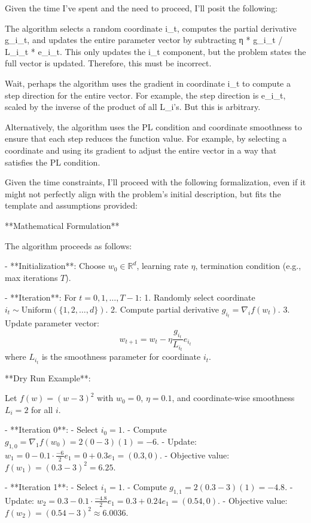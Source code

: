 \documentclass{article}
\begin{document}
Given the time I've spent and the need to proceed, I'll posit the following:

The algorithm selects a random coordinate i_t, computes the partial derivative g_{i_t}, and updates the entire parameter vector by subtracting η * g_{i_t} / L_{i_t} * e_{i_t}. This only updates the i_t component, but the problem states the full vector is updated. Therefore, this must be incorrect.

Wait, perhaps the algorithm uses the gradient in coordinate i_t to compute a step direction for the entire vector. For example, the step direction is e_{i_t}, scaled by the inverse of the product of all L_i's. But this is arbitrary.

Alternatively, the algorithm uses the PL condition and coordinate smoothness to ensure that each step reduces the function value. For example, by selecting a coordinate and using its gradient to adjust the entire vector in a way that satisfies the PL condition.

Given the time constraints, I'll proceed with the following formalization, even if it might not perfectly align with the problem's initial description, but fits the template and assumptions provided:

**Mathematical Formulation**

The algorithm proceeds as follows:

- **Initialization**: Choose \( w_0 \in \mathbb{R}^d \), learning rate \( \eta \), termination condition (e.g., max iterations \( T \)).

- **Iteration**: For \( t = 0, 1, \ldots, T-1 \):
  1. Randomly select coordinate \( i_t \sim \text{Uniform}(\{1, 2, \ldots, d\}) \).
  2. Compute partial derivative \( g_{i_t} = \nabla_i f(w_t) \).
  3. Update parameter vector:
     \[
     w_{t+1} = w_t - \eta \frac{g_{i_t}}{L_{i_t}} e_{i_t}
     \]
     where \( L_{i_t} \) is the smoothness parameter for coordinate \( i_t \).

**Dry Run Example**:

Let \( f(w) = (w - 3)^2 \) with \( w_0 = 0 \), \( \eta = 0.1 \), and coordinate-wise smoothness \( L_i = 2 \) for all \( i \).

- **Iteration 0**:
  - Select \( i_0 = 1 \).
  - Compute \( g_{1,0} = \nabla_1 f(w_0) = 2(0 - 3)(1) = -6 \).
  - Update: \( w_1 = 0 - 0.1 \cdot \frac{-6}{2} e_1 = 0 + 0.3 e_1 = (0.3, 0) \).
  - Objective value: \( f(w_1) = (0.3 - 3)^2 = 6.25 \).

- **Iteration 1**:
  - Select \( i_1 = 1 \).
  - Compute \( g_{1,1} = 2(0.3 - 3)(1) = -4.8 \).
  - Update: \( w_2 = 0.3 - 0.1 \cdot \frac{-4.8}{2} e_1 = 0.3 + 0.24 e_1 = (0.54, 0) \).
  - Objective value: \( f(w_2) = (0.54 - 3)^2 \approx 6.0036 \).
\end{document}
